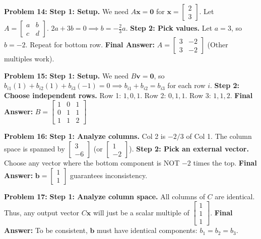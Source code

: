 \documentclass[12pt]{article}
\begin{document}
\textbf{Problem 14:}
\textbf{Step 1: Setup.} We need $A\mathbf{x} = \mathbf{0}$ for $\mathbf{x} = \begin{bmatrix} 2 \\ 3 \end{bmatrix}$. Let $A = \begin{bmatrix} a & b \\ c & d \end{bmatrix}$.
$2a + 3b = 0 \implies b = -\frac{2}{3}a$.
\textbf{Step 2: Pick values.} Let $a = 3$, so $b = -2$. Repeat for bottom row.
\textbf{Final Answer:} $A = \begin{bmatrix} 3 & -2 \\ 3 & -2 \end{bmatrix}$ (Other multiples work).

\textbf{Problem 15:}
\textbf{Step 1: Setup.} We need $B\mathbf{v} = \mathbf{0}$, so $b_{i1}(1) + b_{i2}(1) + b_{i3}(-1) = 0 \implies b_{i1} + b_{i2} = b_{i3}$ for each row $i$.
\textbf{Step 2: Choose independent rows.}
Row 1: $1, 0, 1$. Row 2: $0, 1, 1$. Row 3: $1, 1, 2$.
\textbf{Final Answer:} $B = \begin{bmatrix} 1 & 0 & 1 \\ 0 & 1 & 1 \\ 1 & 1 & 2 \end{bmatrix}$

\textbf{Problem 16:}
\textbf{Step 1: Analyze columns.} Col 2 is $-2/3$ of Col 1. The column space is spanned by $\begin{bmatrix} 3 \\ -6 \end{bmatrix}$ (or $\begin{bmatrix} 1 \\ -2 \end{bmatrix}$).
\textbf{Step 2: Pick an external vector.} Choose any vector where the bottom component is NOT $-2$ times the top.
\textbf{Final Answer:} $\mathbf{b} = \begin{bmatrix} 1 \\ 1 \end{bmatrix}$ guarantees inconsistency.

\textbf{Problem 17:}
\textbf{Step 1: Analyze column space.} All columns of $C$ are identical. Thus, any output vector $C\mathbf{x}$ will just be a scalar multiple of $\begin{bmatrix} 1 \\ 1 \\ 1 \end{bmatrix}$.
\textbf{Final Answer:} To be consistent, $\mathbf{b}$ must have identical components: $b_1 = b_2 = b_3$.
\end{document}
